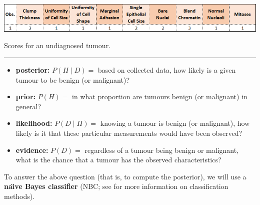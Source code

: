     \begin{table}[!t]
    \centering
      \includegraphics[width=\textwidth]{Images/testA12.png}
      \caption[\small Scores for an undiagnosed tumour]{\small Scores for an undiagnosed tumour.}
      \label{fig:testA12}\hrule
    \end{table}
\afterpage{\FloatBarrier}
\begin{itemize}[noitemsep]
    \item \textbf{posterior:} $P(H\mid D)=$ based on collected data, how likely is a given tumour to be benign (or malignant)?
    \item \textbf{prior:} $P(H)=$ in what proportion are tumours benign (or malignant) in general? 
    \item \textbf{likelihood:} $P(D\mid H)=$ knowing a tumour is benign (or malignant), how likely is it that these particular measurements would have been observed?
    \item \textbf{evidence:} $P(D)=$ regardless of a tumour being benign or malignant, what is the chance that a tumour has the observed characteristics?
\end{itemize}
To answer the above question (that is, to compute the posterior), we will use a \textbf{na\"{\i}ve Bayes classifier} (NBC; see \cite{DAL_DSML} for more information on  classification methods).


